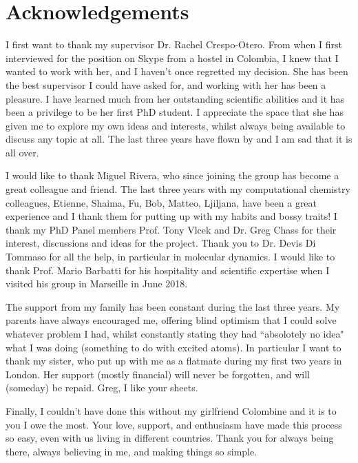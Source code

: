 \chapter*{Acknowledgements}
I first want to thank my supervisor Dr. Rachel Crespo-Otero. From when I first interviewed for the position on Skype from a hostel in Colombia, I knew that I wanted to work with her, and I haven't once regretted my decision. She has been the best supervisor I could have asked for, and working with her has been a pleasure. I have learned much from her outstanding scientific abilities and it has been a privilege to be her first PhD student. I appreciate the space that she has given me to explore my own ideas and interests, whilst always being available to discuss any topic at all. The last three years have flown by and I am sad that it is all over. 

I would like to thank Miguel Rivera, who since joining the group has become a great colleague and friend. The last three years with my computational chemistry colleagues, Etienne, Shaima, Fu, Bob, Matteo, Ljiljana, have been a great experience and I thank them for putting up with my habits and bossy traits! I thank my PhD Panel members Prof. Tony Vlcek and Dr. Greg Chass for their interest, discussions and ideas for the project. Thank you to Dr. Devis Di Tommaso for all the help, in particular in molecular dynamics. I would like to thank Prof. Mario Barbatti for his hospitality and scientific expertise when I visited his group in Marseille in June 2018.

The support from my family has been constant during the last three years. My parents have always encouraged me, offering blind optimism that I could solve whatever problem I had, whilst constantly stating they had ``absolotely no idea" what I was doing (something to do with excited atoms). In particular I want to thank my sister, who put up with me as a flatmate during my first two years in London. Her support (mostly financial) will never be forgotten, and will (someday) be repaid. Greg, I like your sheets. 

Finally, I couldn't have done this without my girlfriend Colombine and it is to you I owe the most. Your love, support, and enthusiasm have made this process so easy, even with us living in different countries. Thank you for always being there, always believing in me, and making things so simple. 
